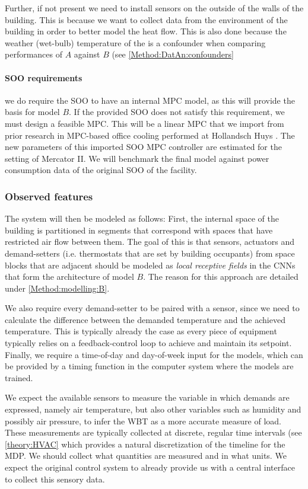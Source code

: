 \documentclass{article}
\theoremstyle{definition}
\theoremstyle{remark}
\begin{document}
Further, if not present we need to install sensors on the outside of the walls of the building. This is because we want to collect data from the environment of the building in order to better model the heat flow. This is also done because the weather (wet-bulb) temperature of the is a confounder when comparing performances of $A$ against $B$ (see \ref{Method:DatAn:confounders}

\paragraph{SOO requirements} we do require the SOO to have an internal MPC model, as this will provide the basis for model $B$. If the provided SOO does not satisfy this requirement, we must design a feasible MPC. This will be a linear MPC that we import from prior research in MPC-based office cooling performed at Hollandsch Huys \cite{hollands}. The new parameters of this imported SOO MPC controller are estimated for the setting of Mercator II. We will benchmark the final model against power consumption data of the original SOO of the facility.

\subsubsection{Observed features}\label{Method:FeatureSel}

The system will then be modeled as follows:
First, the internal space of the building is partitioned in segments that correspond with spaces that have restricted air flow between them. The goal of this is that sensors, actuators and demand-setters (i.e. thermostats that are set by building occupants) from space blocks that are adjacent should be modeled as \textit{local receptive fields} in the CNNs that form the architecture of model $B$. The reason for this approach are detailed under \ref{Method:modelling:B}. 

We also require every demand-setter to be paired with a sensor, since we need to calculate the difference between the demanded temperature and the achieved temperature. This is typically already the case as every piece of equipment typically relies on a feedback-control loop to achieve and maintain its setpoint. Finally, we require a time-of-day and day-of-week input for the models, which can be provided by a timing function in the computer system where the models are trained.

We expect the available sensors to measure the variable in which demands are expressed, namely air temperature, but also other variables such as humidity and possibly air pressure, to infer the WBT as a more accurate measure of load. These measurements are typically collected at discrete, regular time intervals (see \ref{theory:HVAC} which provides a natural discretization of the timeline for the MDP. We should collect what quantities are measured and in what units. We expect the original control system to already provide us with a central interface to collect this sensory data.
\end{document}
